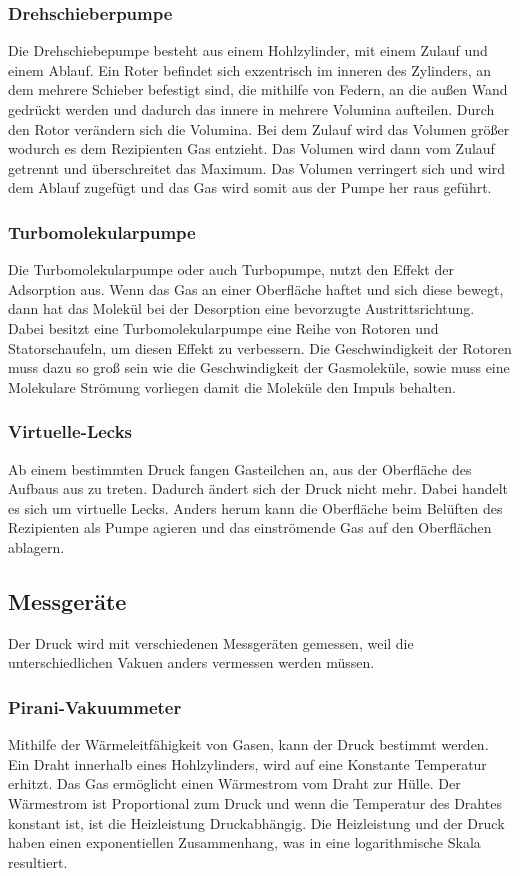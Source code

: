 \subsubsection{Drehschieberpumpe}
Die Drehschiebepumpe besteht aus einem Hohlzylinder, mit einem Zulauf und einem Ablauf. Ein Roter befindet sich exzentrisch im inneren des Zylinders, an dem mehrere Schieber befestigt sind, die mithilfe von Federn, an die außen Wand gedrückt werden und dadurch das innere in mehrere Volumina aufteilen. Durch den Rotor verändern sich die Volumina. Bei dem Zulauf wird das Volumen größer wodurch es dem Rezipienten Gas entzieht. Das Volumen wird dann vom Zulauf getrennt und überschreitet das Maximum. Das Volumen verringert sich  und wird dem Ablauf zugefügt und das Gas wird somit aus der Pumpe her raus geführt.

\subsubsection{Turbomolekularpumpe}
Die Turbomolekularpumpe oder auch Turbopumpe, nutzt den Effekt der Adsorption aus. Wenn das Gas an einer Oberfläche haftet und sich diese bewegt, dann hat das Molekül bei der Desorption eine bevorzugte Austrittsrichtung. Dabei besitzt eine Turbomolekularpumpe eine Reihe von Rotoren und Statorschaufeln, um diesen Effekt zu verbessern. Die Geschwindigkeit der Rotoren muss dazu so groß sein wie die Geschwindigkeit der Gasmoleküle, sowie muss eine Molekulare Strömung vorliegen damit die Moleküle den Impuls behalten.
\subsubsection{Virtuelle-Lecks}
Ab einem bestimmten Druck fangen Gasteilchen an, aus der Oberfläche des Aufbaus aus zu treten. Dadurch ändert sich der Druck nicht mehr. Dabei handelt es sich um virtuelle Lecks. Anders herum kann die Oberfläche beim Belüften des Rezipienten als Pumpe agieren und das einströmende Gas auf den Oberflächen ablagern.
\subsection{Messgeräte}
Der Druck wird mit verschiedenen Messgeräten gemessen, weil die unterschiedlichen Vakuen anders vermessen werden müssen.
\subsubsection{Pirani-Vakuummeter}
Mithilfe der Wärmeleitfähigkeit von Gasen, kann der Druck bestimmt werden. Ein Draht innerhalb eines Hohlzylinders, wird auf eine Konstante Temperatur erhitzt. Das Gas ermöglicht einen Wärmestrom vom Draht zur Hülle. Der Wärmestrom ist Proportional zum Druck und wenn die Temperatur des Drahtes konstant ist, ist die Heizleistung Druckabhängig. Die Heizleistung und der Druck haben einen exponentiellen Zusammenhang, was in eine logarithmische Skala resultiert.
